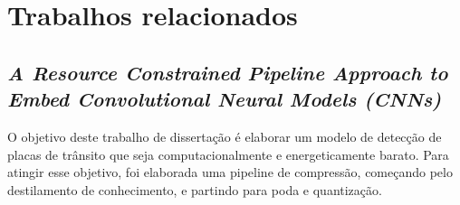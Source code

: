 \chapter{Trabalhos relacionados}\label{cap_trabalhos_relacionados}

\section{\textit{A Resource Constrained Pipeline Approach to Embed Convolutional Neural Models (CNNs)}}
O objetivo deste trabalho de dissertação \cite{rafael} é elaborar um modelo de detecção de placas de trânsito que seja
computacionalmente e energeticamente barato. Para atingir esse objetivo, foi elaborada uma pipeline de compressão,
começando pelo destilamento de conhecimento, e partindo para poda e quantização.

